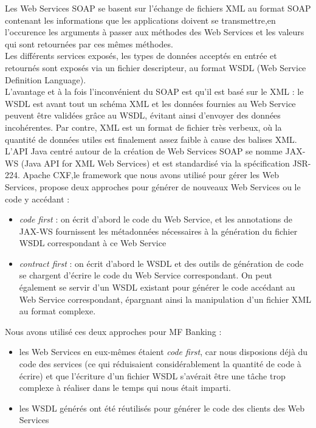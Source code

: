 Les Web Services SOAP se basent sur l'échange de fichiers XML au format SOAP contenant les informations que les applications doivent se transmettre,en l'occurence les arguments à passer aux méthodes des Web Services et les valeurs qui sont retournées par ces m\^emes méthodes.\\
Les différents services exposés, les types de données acceptés en entrée et retournés sont exposés via un fichier descripteur, au format WSDL (Web Service Definition Language).\\
L'avantage et à la fois l'inconvénient du SOAP est qu'il est basé sur le XML : le WSDL est avant tout un schéma XML et les données fournies au Web Service peuvent être validées grâce au WSDL, évitant ainsi d'envoyer des données incohérentes. Par contre, XML est un format de fichier très verbeux, où la quantité de données \og utiles \fg{} est finalement assez faible à cause des balises XML. \\
L'API Java centré autour de la création de Web Services SOAP se nomme JAX-WS (Java API for XML Web Services) et est standardisé via la spécification JSR-224.
Apache CXF,le framework que nous avons utilisé pour gérer les Web Services, propose deux approches pour générer de nouveaux Web Services ou le code y accédant : 
\begin{itemize}
	\item \textit{code first} : on écrit d'abord le code du Web  Service, et les annotations de JAX-WS fournissent les métadonnées nécessaires à la génération du fichier WSDL correspondant à ce Web Service
	\item \textit{contract first} : on écrit d'abord le WSDL et des outils de génération de code se chargent d'écrire le code du Web Service correspondant. On peut également se servir d'un WSDL existant pour générer le code accédant au Web Service correspondant, épargnant ainsi la manipulation d'un fichier XML au format complexe.\\
\end{itemize}
Nous avons utilisé ces deux approches pour MF Banking :
\begin{itemize}
	\item les Web Services en eux-mêmes étaient \textit{code first}, car nous disposions déjà du code des services (ce qui réduisaient considérablement la quantité de code à écrire) et que l'écriture d'un fichier WSDL s'avérait être une tâche trop complexe à réaliser dans le temps qui nous était imparti.
	\item les WSDL générés ont été réutilisés pour générer le code des clients des Web Services\\
\end{itemize}

